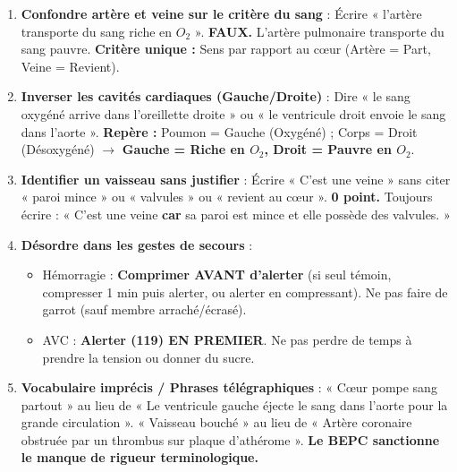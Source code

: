 \documentclass[11pt]{article}
\begin{document}
\begin{attention}
\begin{enumerate}
\item \textbf{Confondre artère et veine sur le critère du sang} : Écrire « l'artère transporte du sang riche en $O_2$ ». \textbf{FAUX.} L'artère pulmonaire transporte du sang pauvre. \textbf{Critère unique :} Sens par rapport au cœur (Artère = Part, Veine = Revient).
\item \textbf{Inverser les cavités cardiaques (Gauche/Droite)} : Dire « le sang oxygéné arrive dans l'oreillette droite » ou « le ventricule droit envoie le sang dans l'aorte ». \textbf{Repère :} Poumon = Gauche (Oxygéné) ; Corps = Droit (Désoxygéné) $\rightarrow$ \textbf{Gauche = Riche en $O_2$, Droit = Pauvre en $O_2$}.
\item \textbf{Identifier un vaisseau sans justifier} : Écrire « C'est une veine » sans citer « paroi mince » ou « valvules » ou « revient au cœur ». \textbf{0 point.} Toujours écrire : « C'est une veine \textbf{car} sa paroi est mince et elle possède des valvules. »
\item \textbf{Désordre dans les gestes de secours} :
    \begin{itemize}
    \item Hémorragie : \textbf{Comprimer AVANT d'alerter} (si seul témoin, compresser 1 min puis alerter, ou alerter en compressant). Ne pas faire de garrot (sauf membre arraché/écrasé).
    \item AVC : \textbf{Alerter (119) EN PREMIER}. Ne pas perdre de temps à prendre la tension ou donner du sucre.
    \end{itemize}
\item \textbf{Vocabulaire imprécis / Phrases télégraphiques} : « Cœur pompe sang partout » au lieu de « Le ventricule gauche éjecte le sang dans l'aorte pour la grande circulation ». « Vaisseau bouché » au lieu de « Artère coronaire obstruée par un thrombus sur plaque d'athérome ». \textbf{Le BEPC sanctionne le manque de rigueur terminologique.}
\end{enumerate}
\end{attention}
\end{document}
